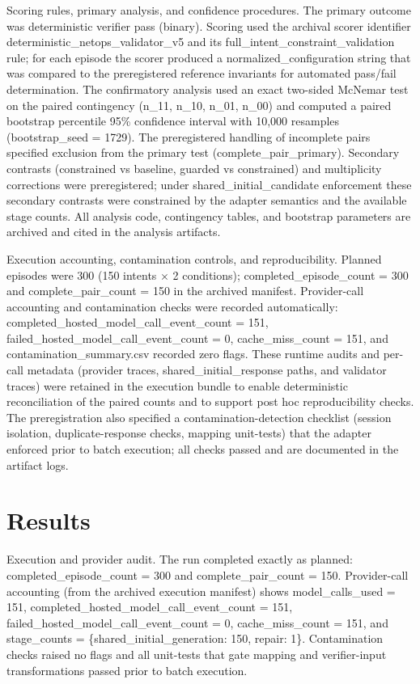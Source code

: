 \documentclass[conference]{IEEEtran}
\begin{document}
Scoring rules, primary analysis, and confidence procedures. The primary outcome was deterministic verifier pass (binary). Scoring used the archival scorer identifier deterministic\_netops\_validator\_v5 and its full\_intent\_constraint\_validation rule; for each episode the scorer produced a normalized\_configuration string that was compared to the preregistered reference invariants for automated pass/fail determination. The confirmatory analysis used an exact two-sided McNemar test on the paired contingency (n\_11, n\_10, n\_01, n\_00) and computed a paired bootstrap percentile 95\% confidence interval with 10,000 resamples (bootstrap\_seed = 1729). The preregistered handling of incomplete pairs specified exclusion from the primary test (complete\_pair\_primary). Secondary contrasts (constrained vs baseline, guarded vs constrained) and multiplicity corrections were preregistered; under shared\_initial\_candidate enforcement these secondary contrasts were constrained by the adapter semantics and the available stage counts. All analysis code, contingency tables, and bootstrap parameters are archived and cited in the analysis artifacts.

Execution accounting, contamination controls, and reproducibility. Planned episodes were 300 (150 intents \ensuremath{\times} 2 conditions); completed\_episode\_count = 300 and complete\_pair\_count = 150 in the archived manifest. Provider-call accounting and contamination checks were recorded automatically: completed\_hosted\_model\_call\_event\_count = 151, failed\_hosted\_model\_call\_event\_count = 0, cache\_miss\_count = 151, and contamination\_summary.csv recorded zero flags. These runtime audits and per-call metadata (provider traces, shared\_initial\_response paths, and validator traces) were retained in the execution bundle to enable deterministic reconciliation of the paired counts and to support post hoc reproducibility checks. The preregistration also specified a contamination-detection checklist (session isolation, duplicate-response checks, mapping unit-tests) that the adapter enforced prior to batch execution; all checks passed and are documented in the artifact logs.

\section{Results}
Execution and provider audit. The run completed exactly as planned: completed\_episode\_count = 300 and complete\_pair\_count = 150. Provider-call accounting (from the archived execution manifest) shows model\_calls\_used = 151, completed\_hosted\_model\_call\_event\_count = 151, failed\_hosted\_model\_call\_event\_count = 0, cache\_miss\_count = 151, and stage\_counts = \{shared\_initial\_generation: 150, repair: 1\}. Contamination checks raised no flags and all unit-tests that gate mapping and verifier-input transformations passed prior to batch execution.
\end{document}
